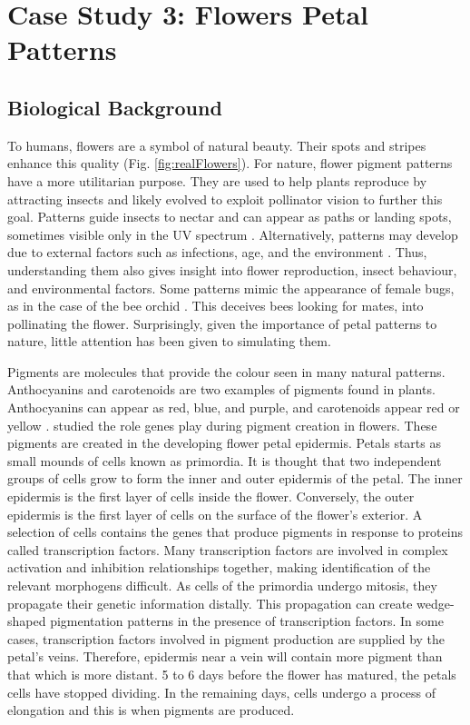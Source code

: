 \chapter{Case Study 3: Flowers Petal Patterns}

\section{Biological Background}
To humans, flowers are a symbol of natural beauty. Their spots and stripes enhance this quality (Fig. \ref{fig:realFlowers}). For nature, flower pigment patterns have a more utilitarian purpose. They are used to help plants reproduce by attracting insects and likely evolved to exploit pollinator vision to further this goal. Patterns guide insects to nectar and can appear as paths or landing spots, sometimes visible only in the UV spectrum \citep{davies2012}. Alternatively, patterns may develop due to external factors such as infections, age, and the environment \citep{davies2012, robinson2015}. Thus, understanding them also gives insight into flower reproduction, insect behaviour, and environmental factors. Some patterns mimic the appearance of female bugs, as in the case of the bee orchid \citep{vereecken7484}. This deceives bees looking for mates, into pollinating the flower. Surprisingly, given the importance of petal patterns to nature, little attention has been given to simulating them.

Pigments are molecules that provide the colour seen in many natural patterns. Anthocyanins and carotenoids are two examples of pigments found in plants. Anthocyanins can appear as red, blue, and purple, and carotenoids appear red or yellow \citep{bayer1966}. \citet{martin1993} studied the role genes play during pigment creation in flowers. These pigments are created in the developing flower petal epidermis. Petals starts as small mounds of cells known as primordia. It is thought that two independent groups of cells grow to form the inner and outer epidermis of the petal. The inner epidermis is the first layer of cells inside the flower. Conversely, the outer epidermis is the first layer of cells on the surface of the flower's exterior. A selection of cells contains the genes that produce pigments in response to proteins called transcription factors. Many transcription factors are involved in complex activation and inhibition relationships together, making identification of the relevant morphogens difficult. As cells of the primordia undergo mitosis, they propagate their genetic information distally. This propagation can create wedge-shaped pigmentation patterns in the presence of transcription factors. In some cases, transcription factors involved in pigment production are supplied by the petal's veins. Therefore, epidermis near a vein will contain more pigment than that which is more distant. 5 to 6 days before the flower has matured, the petals cells have stopped dividing. In the remaining days, cells undergo a process of elongation and this is when pigments are produced.

